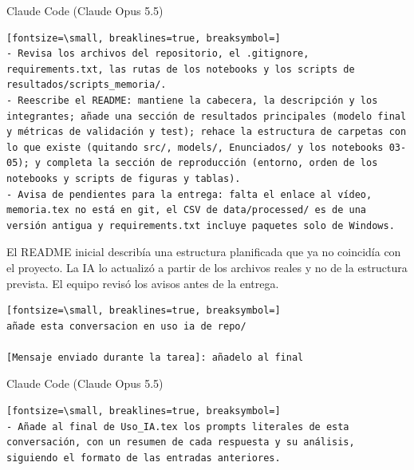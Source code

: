 \documentclass[12pt,a4paper,oneside]{book}
\begin{document}
\begin{iaresp}{Claude Code (Claude Opus 5.5)}
\begin{Verbatim}[fontsize=\small, breaklines=true, breaksymbol=]
- Revisa los archivos del repositorio, el .gitignore, requirements.txt, las rutas de los notebooks y los scripts de resultados/scripts_memoria/.
- Reescribe el README: mantiene la cabecera, la descripción y los integrantes; añade una sección de resultados principales (modelo final y métricas de validación y test); rehace la estructura de carpetas con lo que existe (quitando src/, models/, Enunciados/ y los notebooks 03-05); y completa la sección de reproducción (entorno, orden de los notebooks y scripts de figuras y tablas).
- Avisa de pendientes para la entrega: falta el enlace al vídeo, memoria.tex no está en git, el CSV de data/processed/ es de una versión antigua y requirements.txt incluye paquetes solo de Windows.
\end{Verbatim}
\end{iaresp}
\begin{iaanalisis}
El README inicial describía una estructura planificada que ya no coincidía con el proyecto. La IA lo actualizó a partir de los archivos reales y no de la estructura prevista. El equipo revisó los avisos antes de la entrega.
\end{iaanalisis}


\begin{iaprompt}
\begin{Verbatim}[fontsize=\small, breaklines=true, breaksymbol=]
añade esta conversacion en uso ia de repo/

[Mensaje enviado durante la tarea]: añadelo al final
\end{Verbatim}
\end{iaprompt}
\begin{iaresp}{Claude Code (Claude Opus 5.5)}
\begin{Verbatim}[fontsize=\small, breaklines=true, breaksymbol=]
- Añade al final de Uso_IA.tex los prompts literales de esta conversación, con un resumen de cada respuesta y su análisis, siguiendo el formato de las entradas anteriores.
\end{Verbatim}
\end{iaresp}
\end{document}
